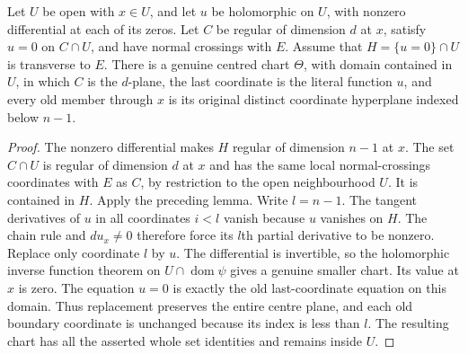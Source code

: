 \begin{theorem}
\label{thm:actual-boundary-contact-literal-coordinates}
\leanok
Let $U$ be open with $x\in U$, and let $u$ be holomorphic on $U$, with nonzero
differential at each of its zeros.  Let $C$ be regular of dimension $d$ at
$x$, satisfy $u=0$ on $C\cap U$, and have normal crossings with $E$.  Assume
that $H=\{u=0\}\cap U$ is transverse to $E$.  There is a genuine centred
chart $\Theta$, with domain contained in $U$, in which $C$ is the $d$-plane,
the last coordinate is the literal function $u$, and every old member
through $x$ is its original distinct coordinate hyperplane indexed below
$n-1$.
\end{theorem}
\begin{proof}
The nonzero differential makes $H$ regular of dimension $n-1$ at $x$.
The set $C\cap U$ is regular of dimension $d$ at $x$ and has the same local
normal-crossings coordinates with $E$ as $C$, by restriction to the open
neighbourhood $U$.  It is contained in $H$.  Apply the preceding lemma.
Write $l=n-1$.  The tangent derivatives of $u$ in all coordinates $i<l$
vanish because $u$ vanishes on $H$.  The chain rule and $du_x\ne0$ therefore
force its $l$th partial derivative to be nonzero.  Replace only coordinate
$l$ by $u$.  The differential is invertible, so the holomorphic inverse
function theorem on $U\cap\operatorname{dom}\psi$ gives a genuine smaller
chart.  Its value at $x$ is zero.  The equation $u=0$ is exactly the old
last-coordinate equation on this domain.  Thus replacement preserves the
entire centre plane, and each old boundary coordinate is unchanged because
its index is less than $l$.  The resulting chart has all the asserted whole
set identities and remains inside $U$.
\end{proof}

